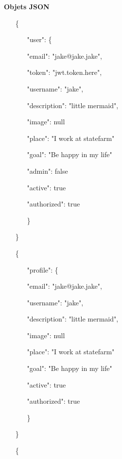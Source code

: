 \documentclass{article}
\begin{document}
\textbf{Objets JSON}
\begin{itemize}
	\item[]
	\item[\{]
	\item[]
	\begin{itemize}
		\item["user": \{]
			\item[]"email": "jake@jake.jake",
			\item[]"token": "jwt.token.here",
			\item[]"username": "jake",
			\item[]"description": "little mermaid",
			\item[]"image": null
			\item[]"place": "I work at statefarm"
			\item[]"goal": "Be happy in my life"
			\item[]"admin": false
			\item[]"active": true
			\item[]"authorized": true
		\item[\}]
	\end{itemize}
	\item[\}]
	\item[]
	\item[]
	\item[\{]
	\item[]
	\begin{itemize}
		\item["profile": \{]
			\item[]"email": "jake@jake.jake",
			\item[]"username": "jake",
			\item[]"description": "little mermaid",
			\item[]"image": null
			\item[]"place": "I work at statefarm"
			\item[]"goal": "Be happy in my life"
			\item[]"active": true
			\item[]"authorized": true
		\item[\}]
	\end{itemize}
	\item[\}]
	\item[]
	\item[]
	\item[]
	\item[\{]
	\item[]
	\begin{itemize}

\end{itemize}
\end{itemize}
\end{document}
